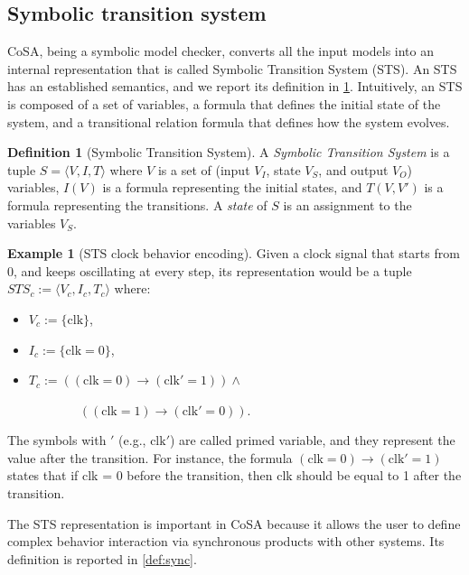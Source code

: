 \documentclass{article}
\theoremstyle{definition}
\newtheorem{example}{Example}[section]
\newtheorem{definition}{Definition}[section]
\begin{document}
\subsection{Symbolic transition system}
\label{sec:sts}

CoSA, being a symbolic model checker, converts all the input models
into an internal representation that is called Symbolic Transition
System (STS). An STS has an established semantics, and we report its
definition in \ref{def:sts}. Intuitively, an STS is composed of a set
of variables, a formula that defines the initial state of the system,
and a transitional relation formula that defines how the system
evolves. 


\begin{definition}[Symbolic Transition System]
\label{def:sts}
A \emph{Symbolic Transition System} is a tuple $S = \langle V, I,
T\rangle$ where $V$ is a set of (input $V_I$, state $V_S$, and
output $V_O$) variables, $I(V)$ is a formula representing the initial
states, and $T(V, V')$ is a formula representing the transitions.  A
\emph{state} of $S$ is an assignment to the variables $V_S$.
\end{definition}

\begin{example}[STS clock behavior encoding]
  \label{sts:clock_beh}
Given a clock signal that starts from 0, and keeps oscillating at
every step, its representation would be a tuple $STS_c := \langle V_c,
I_c, T_c\rangle$ where:
\begin{itemize}
\item $V_c := \{\text{clk}\}$,
\item $I_c := \{\text{clk} = 0\}$,
\item $T_c := ((\text{clk} = 0) \rightarrow (\text{clk}' = 1)) \wedge$

~~~~~~~~$((\text{clk} = 1) \rightarrow (\text{clk}' = 0))$.
\end{itemize}


The symbols with $'$ (e.g., $\text{clk}'$) are called primed variable,
and they represent the value after the transition. For instance, the
formula $(\text{clk} = 0) \rightarrow (\text{clk}' = 1)$ states that
if clk = 0 before the transition, then clk should be equal to 1 after
the transition.
  
\end{example}

The STS representation is important in CoSA because it allows the user
to define complex behavior interaction via synchronous products with
other systems. Its definition is reported in \ref{def:sync}.
\end{document}
